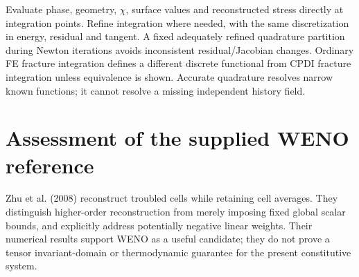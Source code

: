 \documentclass[10pt,letterpaper]{article}
\begin{document}
Evaluate phase, geometry, $\chi$, surface values and reconstructed stress directly at integration points. Refine integration where needed, with the same discretization in energy, residual and tangent. A fixed adequately refined quadrature partition during Newton iterations avoids inconsistent residual/Jacobian changes. Ordinary FE fracture integration defines a different discrete functional from CPDI fracture integration unless equivalence is shown. Accurate quadrature resolves narrow known functions; it cannot resolve a missing independent history field.

\section{Assessment of the supplied WENO reference}
Zhu et al. (2008) reconstruct troubled cells while retaining cell averages. They distinguish higher-order reconstruction from merely imposing fixed global scalar bounds, and explicitly address potentially negative linear weights. Their numerical results support WENO as a useful candidate; they do not prove a tensor invariant-domain or thermodynamic guarantee for the present constitutive system.
\end{document}
